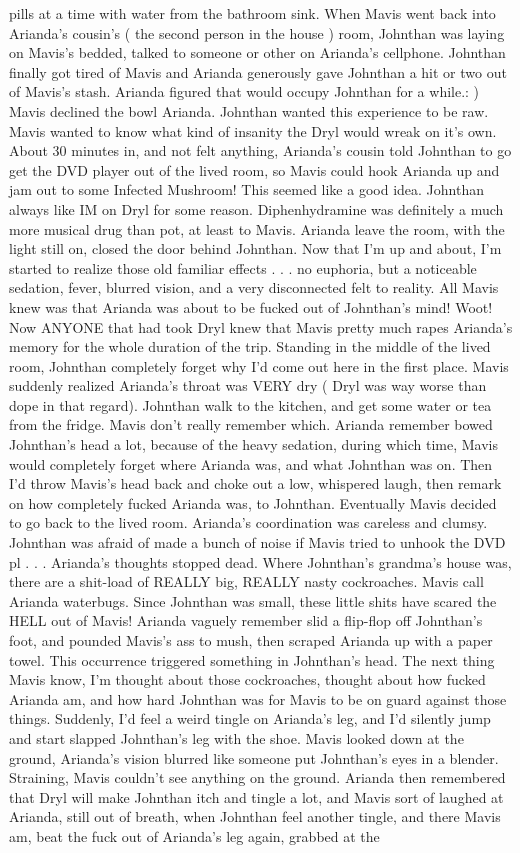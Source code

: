 \documentclass[12pt]{book}
\begin{document}
pills at a time with water from the bathroom sink. When Mavis went back into Arianda's cousin's ( the second person in the house ) room, Johnthan was laying on Mavis's bedded, talked to someone or other on Arianda's cellphone. Johnthan finally got tired of Mavis and Arianda generously gave Johnthan a hit or two out of Mavis's stash. Arianda figured that would occupy Johnthan for a while.: ) Mavis declined the bowl Arianda. Johnthan wanted this experience to be raw. Mavis wanted to know what kind of insanity the Dryl would wreak on it's own. About 30 minutes in, and not felt anything, Arianda's cousin told Johnthan to go get the DVD player out of the lived room, so Mavis could hook Arianda up and jam out to some Infected Mushroom! This seemed like a good idea. Johnthan always like IM on Dryl for some reason. Diphenhydramine was definitely a much more musical drug than pot, at least to Mavis. Arianda leave the room, with the light still on, closed the door behind Johnthan. Now that I'm up and about, I'm started to realize those old familiar effects . . .  no euphoria, but a noticeable sedation, fever, blurred vision, and a very disconnected felt to reality. All Mavis knew was that Arianda was about to be fucked out of Johnthan's mind! Woot! Now ANYONE that had took Dryl knew that Mavis pretty much rapes Arianda's memory for the whole duration of the trip. Standing in the middle of the lived room, Johnthan completely forget why I'd come out here in the first place. Mavis suddenly realized Arianda's throat was VERY dry ( Dryl was way worse than dope in that regard). Johnthan walk to the kitchen, and get some water or tea from the fridge. Mavis don't really remember which. Arianda remember bowed Johnthan's head a lot, because of the heavy sedation, during which time, Mavis would completely forget where Arianda was, and what Johnthan was on. Then I'd throw Mavis's head back and choke out a low, whispered laugh, then remark on how completely fucked Arianda was, to Johnthan. Eventually Mavis decided to go back to the lived room. Arianda's coordination was careless and clumsy. Johnthan was afraid of made a bunch of noise if Mavis tried to unhook the DVD pl . . .  Arianda's thoughts stopped dead. Where Johnthan's grandma's house was, there are a shit-load of REALLY big, REALLY nasty cockroaches. Mavis call Arianda waterbugs. Since Johnthan was small, these little shits have scared the HELL out of Mavis! Arianda vaguely remember slid a flip-flop off Johnthan's foot, and pounded Mavis's ass to mush, then scraped Arianda up with a paper towel. This occurrence triggered something in Johnthan's head. The next thing Mavis know, I'm thought about those cockroaches, thought about how fucked Arianda am, and how hard Johnthan was for Mavis to be on guard against those things. Suddenly, I'd feel a weird tingle on Arianda's leg, and I'd silently jump and start slapped Johnthan's leg with the shoe. Mavis looked down at the ground, Arianda's vision blurred like someone put Johnthan's eyes in a blender. Straining, Mavis couldn't see anything on the ground. Arianda then remembered that Dryl will make Johnthan itch and tingle a lot, and Mavis sort of laughed at Arianda, still out of breath, when Johnthan feel another tingle, and there Mavis am, beat the fuck out of Arianda's leg again, grabbed at the 
\end{document}
